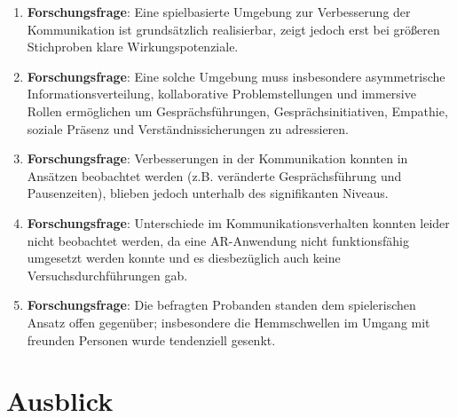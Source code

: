 \begin{enumerate}
    \item \textbf{Forschungsfrage}: Eine spielbasierte Umgebung zur Verbesserung der Kommunikation ist grundsätzlich realisierbar, zeigt jedoch erst bei größeren Stichproben klare Wirkungspotenziale.
    \item \textbf{Forschungsfrage}: Eine solche Umgebung muss insbesondere asymmetrische Informationsverteilung, kollaborative Problemstellungen und immersive Rollen ermöglichen um Gesprächsführungen, Gesprächsinitiativen, Empathie, soziale Präsenz und Verständnissicherungen zu adressieren.
    \item \textbf{Forschungsfrage}: Verbesserungen in der Kommunikation konnten in Ansätzen beobachtet werden (z.B. veränderte Gesprächsführung und Pausenzeiten), blieben jedoch unterhalb des signifikanten Niveaus.
    \item \textbf{Forschungsfrage}: Unterschiede im Kommunikationsverhalten konnten leider nicht beobachtet werden, da eine \ac{AR}-Anwendung nicht funktionsfähig umgesetzt werden konnte und es diesbezüglich auch keine Versuchsdurchführungen gab.
    \item \textbf{Forschungsfrage}: Die befragten Probanden standen dem spielerischen Ansatz offen gegenüber; insbesondere die Hemmschwellen im Umgang mit freunden Personen wurde tendenziell gesenkt.
\end{enumerate}

\section{Ausblick}\label{sec:prospect}